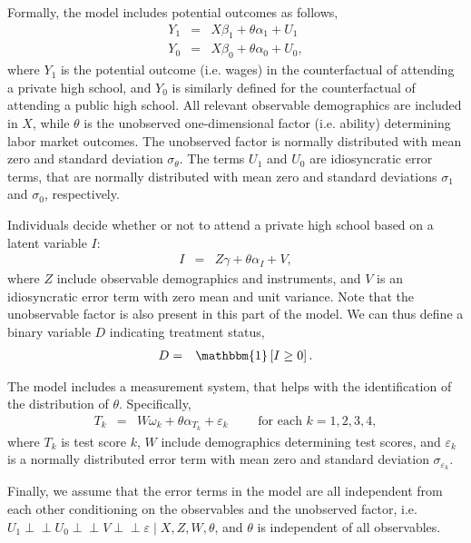 \documentclass[english,12pt]{article}
\newcommand{\indep}{\perp \!\!\! \perp}
\begin{document}
Formally, the model includes potential outcomes as follows,
    \begin{eqnarray*}
    Y_{1} & = & X\beta_1 + \theta\alpha_1 + U_{1} \\
    Y_{0} &=& X\beta_0 + \theta\alpha_0 + U_{0} ,
    \end{eqnarray*}
where $Y_1$ is the potential outcome (i.e. wages) in the counterfactual of attending a private high school, and $Y_0$ is similarly defined for the counterfactual of attending a public high school. All relevant observable demographics are included in $X$, while $\theta$ is the unobserved one-dimensional factor (i.e. ability) determining labor market outcomes. The unobserved factor is normally distributed with mean zero and standard deviation $\sigma_\theta$. The terms $U_1$ and $U_0$ are idiosyncratic error terms, that are normally distributed with mean zero and standard deviations $\sigma_1$ and $\sigma_0$, respectively.

Individuals decide whether or not to attend a private high school based on a latent variable $I$:
    \begin{eqnarray*}
    I &=&Z\gamma + \theta\alpha_I + V , 
    \end{eqnarray*}
where $Z$ include observable demographics and instruments, and $V$ is an idiosyncratic error term with zero mean and unit variance. Note that the unobservable factor is also present in this part of the model. We can thus define a binary variable $D$ indicating treatment status,
    \begin{eqnarray*}
    D &=&\mathbbm{1}\left[ I\geq0\right].
    \end{eqnarray*}

The model includes a measurement system, that helps with the identification of the distribution of $\theta$. Specifically,
    \begin{eqnarray*}
    T_k &=&W\omega_k + \theta\alpha_{T_k} + \varepsilon_k \quad\quad \mbox{ for each } k=1,2,3,4 , 
    \end{eqnarray*}
where $T_k$ is test score $k$, $W$ include demographics determining test scores, and $\varepsilon_k$ is a normally distributed error term with mean zero and standard deviation $\sigma_{\varepsilon_k}$.
    
Finally, we assume that the error terms in the model are all independent from each other conditioning on the observables and the unobserved factor, i.e. $U_1 \indep U_0 \indep V \indep \varepsilon \mid X, Z, W, \theta$, and $\theta$ is independent of all observables.
\end{document}
